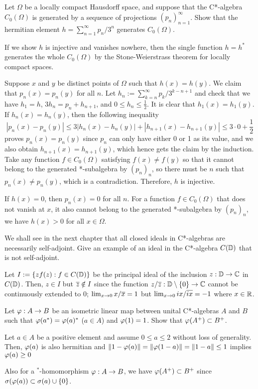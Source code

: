 \documentclass[12pt]{article}
\begin{document}
\begin{prb}
Let $\Omega$ be a locally compact Hausdorff space, and suppose that the C*-algebra $C_0(\Omega)$ is generated by a sequence of projections $(p_n)_{n=1}^\infty$.
Show that the hermitian element $h=\sum_{n=1}^\infty p_n/3^n$ generates $C_0(\Omega)$.
\end{prb}
\begin{sol}
If we show $h$ is injective and vanishes nowhere, then the single function $h=h^*$ generates the whole $C_0(\Omega)$ by the Stone-Weierstrass theorem for locally compact spaces.

Suppose $x$ and $y$ be distinct points of $\Omega$ such that $h(x)=h(y)$.
We claim that $p_n(x)=p_n(y)$ for all $n$.
Let $h_n:=\sum_{k=n}^\infty p_k/3^{k-n+1}$ and check that we have $h_1=h$, $3h_n=p_n+h_{n+1}$, and $0\le h_n\le\frac12$.
It is clear that $h_1(x)=h_1(y)$.
If $h_n(x)=h_n(y)$, then the following inequality
\[|p_n(x)-p_n(y)|\le3|h_n(x)-h_n(y)|+|h_{n+1}(x)-h_{n+1}(y)|\le3\cdot0+\frac12\]
proves $p_n(x)=p_n(y)$ since $p_n$ can only have either 0 or 1 as its value, and we also obtain $h_{n+1}(x)=h_{n+1}(y)$, which hence gets the claim by the induction.
Take any function $f\in C_0(\Omega)$ satisfying $f(x)\ne f(y)$ so that it cannot belong to the generated *-subalgebra by $(p_n)_n$, so there must be $n$ such that $p_n(x)\ne p_n(y)$, which is a contradiction.
Therefore, $h$ is injective.

If $h(x)=0$, then $p_n(x)=0$ for all $n$.
For a function $f\in C_0(\Omega)$ that does not vanish at $x$, it also cannot belong to the generated *-subalgebra by $(p_n)_n$, we have $h(x)>0$ for all $x\in\Omega$.
\end{sol}


\begin{prb}
We shall see in the next chapter that all closed ideals in C*-algebras are necessarily self-adjoint.
Give an example of an ideal in the C*-algebra $C(\mathbb{D})$ that is not self-adjoint.
\end{prb}
\begin{sol}
Let $I:=\{zf(z):f\in C(\mathbb{D})\}$ be the principal ideal of the inclusion $z:\mathbb{D}\to\mathbb{C}$ in $C(\mathbb{D})$.
Then, $z\in I$ but $\overline z\notin I$ since the function $z/\overline z:\mathbb{D}\setminus\{0\}\to\mathbb{C}$ cannot be continuously extended to 0; $\lim_{x\to0}x/\overline{x}=1$ but $\lim_{x\to0}ix/\overline{ix}=-1$ where $x\in\mathbb{R}$.
\end{sol}


\begin{prb}
Let $\varphi:A\to B$ be an isometric linear map between unital C*-algebras $A$ and $B$ such that $\varphi(a^*)=\varphi(a)^*$ ($a\in A$) and $\varphi(1)=1$.
Show that $\varphi(A^+)\subset B^+$.
\end{prb}
\begin{sol}
Let $a\in A$ be a positive element and assume $0\le a\le2$ without loss of generality.
Then, $\varphi(a)$ is also hermitian and $\|1-\varphi(a)\|=\|\varphi(1-a)\|=\|1-a\|\le1$ implies $\varphi(a)\ge0$
\end{sol}
\begin{rmk}
Also for a $^*$-homomorphism $\varphi:A\to B$, we have $\varphi(A^+)\subset B^+$ since $\sigma(\varphi(a))\subset\sigma(a)\cup\{0\}$.
\end{rmk}
\end{document}
